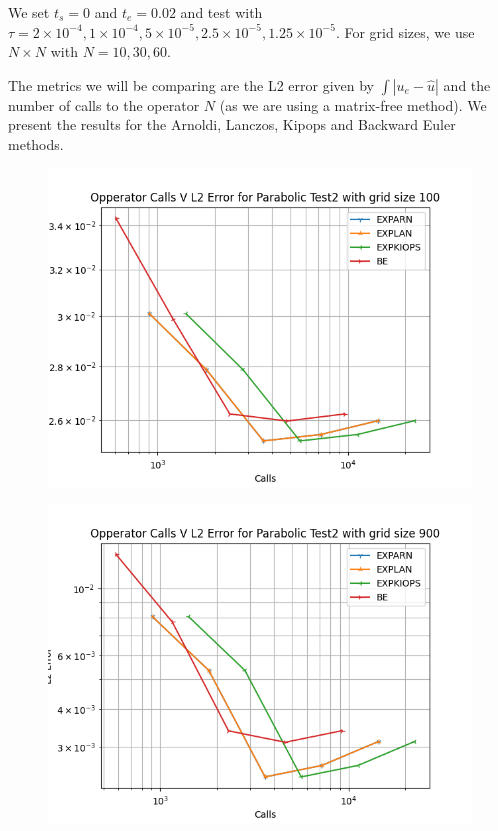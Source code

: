 \documentclass{article}
\begin{document}
We set $t_s = 0$ and $t_e = 0.02$ and test with $\tau = 2\times 10^{-4}, 1\times 10^{-4}, 5\times 10^{-5}, 2.5\times 10^{-5}, 1.25\times 10^{-5}$.
For grid sizes, we use $N\times N$ with $N = 10,30,60$.

The metrics we will be comparing are the L2 error given by $\int |u_e - \hat u|$ and the number of calls to the operator $N$ (as we are using a matrix-free method).
We present the results for the Arnoldi, Lanczos, Kipops\cite{Gaudreault2018} and Backward Euler methods.

\begin{figure}[H]
	  \includegraphics[width=\linewidth]{FEMethodPlots/Operator Calls V Error for Parabolic Test2 with grid size 100.png}
\end{figure}
\begin{figure}[H]
	  \includegraphics[width=\linewidth]{FEMethodPlots/Operator Calls V Error for Parabolic Test2 with grid size 900.png}
\end{figure}
\end{document}

